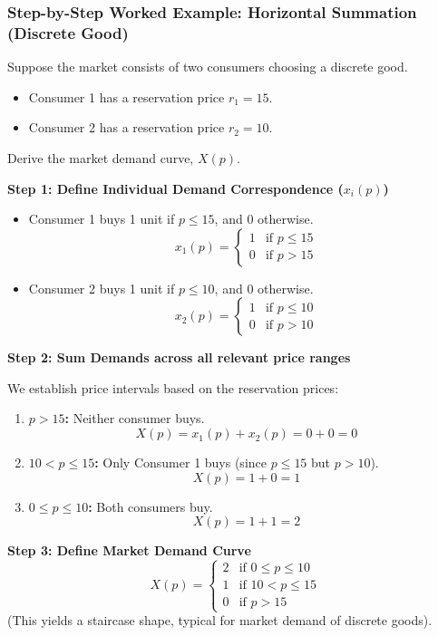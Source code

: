 \documentclass{article}
\begin{document}
\subsubsection*{Step-by-Step Worked Example: Horizontal Summation (Discrete Good)}

Suppose the market consists of two consumers choosing a discrete good.
\begin{itemize}
    \item Consumer 1 has a reservation price $r_1 = 15$.
    \item Consumer 2 has a reservation price $r_2 = 10$.
\end{itemize}
Derive the market demand curve, $X(p)$.

\textbf{Step 1: Define Individual Demand Correspondence ($x_i(p)$)}
\begin{itemize}
    \item Consumer 1 buys 1 unit if $p \leq 15$, and 0 otherwise. 
    \[ x_1(p) = \begin{cases} 1 & \text{if } p \leq 15 \\ 0 & \text{if } p > 15 \end{cases} \]
    \item Consumer 2 buys 1 unit if $p \leq 10$, and 0 otherwise. 
    \[ x_2(p) = \begin{cases} 1 & \text{if } p \leq 10 \\ 0 & \text{if } p > 10 \end{cases} \]
\end{itemize}

\textbf{Step 2: Sum Demands across all relevant price ranges} 

We establish price intervals based on the reservation prices:
\begin{enumerate}
    \item \textbf{$p > 15$:} Neither consumer buys. 
    \[ X(p) = x_1(p) + x_2(p) = 0 + 0 = 0 \]
    \item \textbf{$10 < p \leq 15$:} Only Consumer 1 buys (since $p \leq 15$ but $p > 10$). 
    \[ X(p) = 1 + 0 = 1 \]
    \item \textbf{$0 \leq p \leq 10$:} Both consumers buy. 
    \[ X(p) = 1 + 1 = 2 \]
\end{enumerate}

\textbf{Step 3: Define Market Demand Curve}
\[ X(p) = \begin{cases} 2 & \text{if } 0 \leq p \leq 10 \\ 1 & \text{if } 10 < p \leq 15 \\ 0 & \text{if } p > 15 \end{cases} \]
(This yields a staircase shape, typical for market demand of discrete goods).
\end{document}
